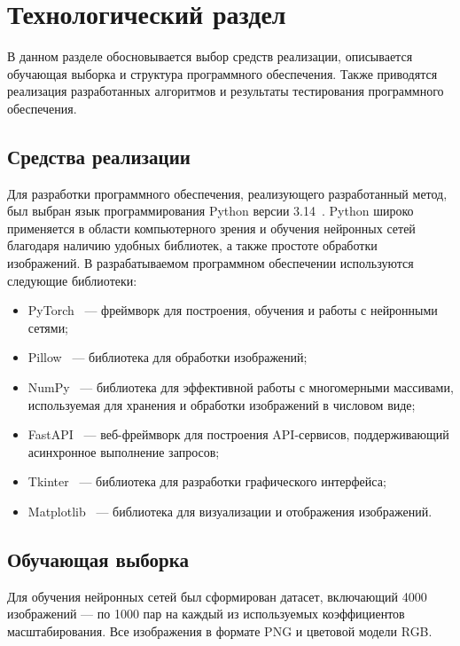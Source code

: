 \chapter{Технологический раздел}

В данном разделе обосновывается выбор средств реализации, описывается обучающая выборка и структура программного обеспечения. Также приводятся реализация разработанных алгоритмов и результаты тестирования программного обеспечения. 

\section{Средства реализации}

Для разработки программного обеспечения, реализующего разработанный метод, был выбран язык программирования Python версии 3.14~\cite{python-docs}. Python широко применяется в области компьютерного зрения и обучения нейронных сетей благодаря наличию удобных библиотек, а также простоте обработки изображений. В разрабатываемом программном обеспечении используются следующие библиотеки:

\begin{itemize}[label=---]
    \item PyTorch~\cite{pytorch-docs} --- фреймворк для построения, обучения и работы с нейронными сетями;
    \item Pillow~\cite{pillow-docs} --- библиотека для обработки изображений;
    \item NumPy~\cite{numpy-docs} --- библиотека для эффективной работы с многомерными массивами, используемая для хранения и обработки изображений в числовом виде;
    \item FastAPI~\cite{fastapi-docs} --- веб-фреймворк для построения API-сервисов, поддерживающий асинхронное выполнение запросов;
    \item Tkinter~\cite{tkinter-docs} --- библиотека для разработки графического интерфейса;
    \item Matplotlib~\cite{matplotlib-docs} --- библиотека для визуализации и отображения изображений.
\end{itemize}

\section{Обучающая выборка}

Для обучения нейронных сетей был сформирован датасет, включающий 4000 изображений --- по 1000 пар на каждый из используемых коэффициентов масштабирования. Все изображения в формате PNG и цветовой модели RGB.

